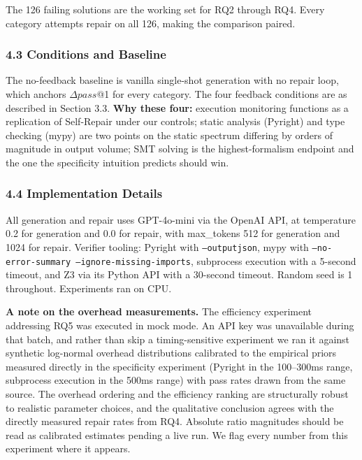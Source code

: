 The 126 failing solutions are the working set for RQ2 through RQ4. Every category attempts repair on all 126, making the comparison paired.

\subsubsection{4.3 Conditions and Baseline}

The no-feedback baseline is vanilla single-shot generation with no repair loop, which anchors $\Delta pass$@1 for every category. The four feedback conditions are as described in Section 3.3. \textbf{Why these four:} execution monitoring functions as a replication of Self-Repair \citep{Olausson2023SelfRepair} under our controls; static analysis (Pyright) and type checking (mypy) are two points on the static spectrum differing by orders of magnitude in output volume; SMT solving is the highest-formalism endpoint and the one the specificity intuition predicts should win.

\subsubsection{4.4 Implementation Details}

All generation and repair uses GPT-4o-mini via the OpenAI API, at temperature 0.2 for generation and 0.0 for repair, with max\_tokens 512 for generation and 1024 for repair. Verifier tooling: Pyright with \texttt{--outputjson}, mypy with \texttt{--no-error-summary --ignore-missing-imports}, subprocess execution with a 5-second timeout, and Z3 via its Python API with a 30-second timeout. Random seed is 1 throughout. Experiments ran on CPU.

\textbf{A note on the overhead measurements.} The efficiency experiment addressing RQ5 was executed in mock mode. An API key was unavailable during that batch, and rather than skip a timing-sensitive experiment we ran it against synthetic log-normal overhead distributions calibrated to the empirical priors measured directly in the specificity experiment (Pyright in the 100--300ms range, subprocess execution in the 500ms range) with pass rates drawn from the same source. The overhead ordering and the efficiency ranking are structurally robust to realistic parameter choices, and the qualitative conclusion agrees with the directly measured repair rates from RQ4. Absolute ratio magnitudes should be read as calibrated estimates pending a live run. We flag every number from this experiment where it appears.

